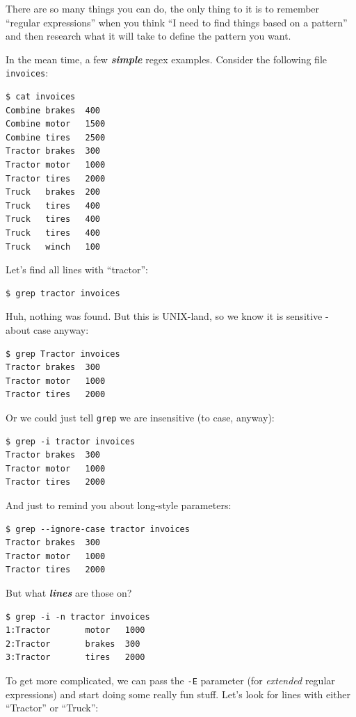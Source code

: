 \documentclass[10pt,]{book}
\numberwithin{figure}{chapter}
\begin{document}
There are so many things you can do, the only thing to it is to remember
``regular expressions'' when you think ``I need to find things based on
a pattern'' and then research what it will take to define the pattern
you want.

In the mean time, a few \textbf{\emph{simple}} regex examples. Consider
the following file \texttt{invoices}:

\begin{verbatim}
$ cat invoices
Combine brakes  400
Combine motor   1500
Combine tires   2500
Tractor brakes  300
Tractor motor   1000
Tractor tires   2000
Truck   brakes  200
Truck   tires   400
Truck   tires   400
Truck   tires   400
Truck   winch   100
\end{verbatim}

Let's find all lines with ``tractor'':

\begin{verbatim}
$ grep tractor invoices
\end{verbatim}

Huh, nothing was found. But this is UNIX-land, so we know it is
sensitive - about case anyway:

\begin{verbatim}
$ grep Tractor invoices
Tractor brakes  300
Tractor motor   1000
Tractor tires   2000
\end{verbatim}

Or we could just tell \texttt{grep} we are insensitive (to case,
anyway):

\begin{verbatim}
$ grep -i tractor invoices
Tractor brakes  300
Tractor motor   1000
Tractor tires   2000
\end{verbatim}

And just to remind you about long-style parameters:

\begin{verbatim}
$ grep --ignore-case tractor invoices
Tractor brakes  300
Tractor motor   1000
Tractor tires   2000
\end{verbatim}

But what \textbf{\emph{lines}} are those on?

\begin{verbatim}
$ grep -i -n tractor invoices
1:Tractor       motor   1000
2:Tractor       brakes  300
3:Tractor       tires   2000
\end{verbatim}

To get more complicated, we can pass the \texttt{-E} parameter (for
\emph{extended} regular expressions) and start doing some really fun
stuff. Let's look for lines with either ``Tractor'' or ``Truck'':
\end{document}
